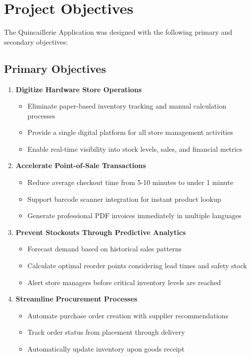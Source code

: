 \section{Project Objectives}

The Quincaillerie Application was designed with the following primary and secondary objectives:

\subsection{Primary Objectives}

\begin{enumerate}[leftmargin=*]
    \item \textbf{Digitize Hardware Store Operations}
    \begin{itemize}
        \item Eliminate paper-based inventory tracking and manual calculation processes
        \item Provide a single digital platform for all store management activities
        \item Enable real-time visibility into stock levels, sales, and financial metrics
    \end{itemize}
    
    \item \textbf{Accelerate Point-of-Sale Transactions}
    \begin{itemize}
        \item Reduce average checkout time from 5-10 minutes to under 1 minute
        \item Support barcode scanner integration for instant product lookup
        \item Generate professional PDF invoices immediately in multiple languages
    \end{itemize}
    
    \item \textbf{Prevent Stockouts Through Predictive Analytics}
    \begin{itemize}
        \item Forecast demand based on historical sales patterns
        \item Calculate optimal reorder points considering lead times and safety stock
        \item Alert store managers before critical inventory levels are reached
    \end{itemize}
    
    \item \textbf{Streamline Procurement Processes}
    \begin{itemize}
        \item Automate purchase order creation with supplier recommendations
        \item Track order status from placement through delivery
        \item Automatically update inventory upon goods receipt
    \end{itemize}
    

\end{enumerate}
